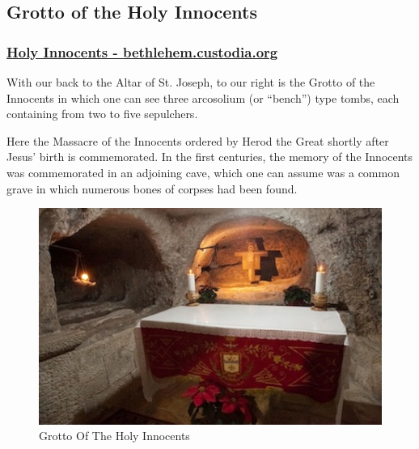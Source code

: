 \documentclass[letterpaper]{report}
\begin{document}
\subsection{Grotto of the Holy Innocents}
\begin{multicols}{2}

\subsubsection{\href{http://www.bethlehem.custodia.org/default.asp?id=473}{
Holy Innocents - bethlehem.custodia.org}}

With our back to the Altar of St. Joseph,
to our right is the Grotto of the Innocents in which one can see three 
arcosolium (or “bench”) type tombs,
each containing from two to five sepulchers.

Here the Massacre of the Innocents ordered by Herod the Great shortly after 
Jesus’ birth is commemorated.
In the first centuries, the memory of the Innocents was commemorated in an
adjoining cave,
which one can assume was a common grave in which numerous bones of corpses had 
been found.

\begin{figure}[H]
\centering
\label{fig:GrottoOfTheInnocents}
\caption{Grotto Of The Holy Innocents}
\includegraphics[width=\columnwidth]{GrottoOfTheInnocents}
\end{figure}

\end{multicols}
\end{document}
